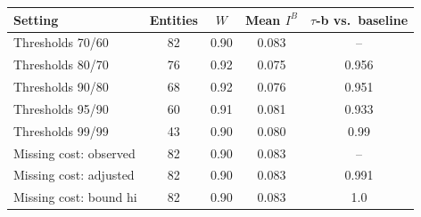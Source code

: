 \begin{tabular}{p{4.8cm}cccc}
\toprule
Setting & Entities & $W$ & Mean $I^B$ & $\tau$-b vs.\ baseline \\
\midrule
Thresholds 70/60 & 82 & 0.90 & 0.083 & -- \\
Thresholds 80/70 & 76 & 0.92 & 0.075 & 0.956 \\
Thresholds 90/80 & 68 & 0.92 & 0.076 & 0.951 \\
Thresholds 95/90 & 60 & 0.91 & 0.081 & 0.933 \\
Thresholds 99/99 & 43 & 0.90 & 0.080 & 0.99 \\
Missing cost: observed & 82 & 0.90 & 0.083 & -- \\
Missing cost: adjusted & 82 & 0.90 & 0.083 & 0.991 \\
Missing cost: bound hi & 82 & 0.90 & 0.083 & 1.0 \\
\bottomrule
\end{tabular}
